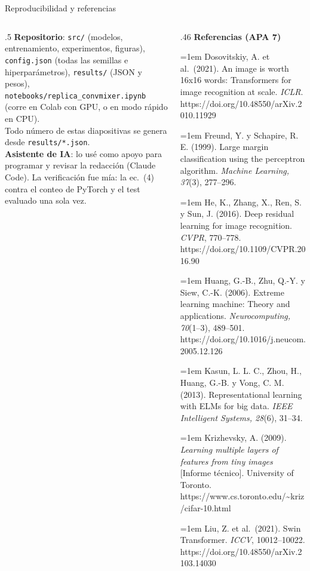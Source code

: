 \documentclass[aspectratio=169,xcolor=table]{beamer}
\begin{document}
\begin{frame}{Reproducibilidad y referencias}
  \begin{columns}[T]
    \begin{column}{.5\textwidth}\footnotesize
      \textbf{Repositorio}: \texttt{src/} (modelos, entrenamiento, experimentos, figuras), \texttt{config.json}
      (todas las semillas e hiperparámetros), \texttt{results/} (JSON y pesos),
      \texttt{notebooks/replica\_convmixer.ipynb} (corre en Colab con GPU, o en modo rápido en CPU).\\[4pt]
      Todo número de estas diapositivas se genera desde \texttt{results/*.json}.\\[4pt]
      \textbf{Asistente de IA}: lo usé como apoyo para programar y revisar la redacción (Claude Code). La
      verificación fue mía: la ec.~(4) contra el conteo de PyTorch y el test evaluado una sola vez.
    \end{column}
    \begin{column}{.46\textwidth}\fontsize{5}{6}\selectfont
      \textbf{Referencias (APA 7)}\par\vspace{2pt}
      \hangindent=1em Dosovitskiy, A. et al.\ (2021). An image is worth 16x16 words: Transformers for image recognition at scale. \emph{ICLR}. https://doi.org/10.48550/arXiv.2010.11929\par
      \hangindent=1em Freund, Y. y Schapire, R. E. (1999). Large margin classification using the perceptron algorithm. \emph{Machine Learning, 37}(3), 277--296.\par
      \hangindent=1em He, K., Zhang, X., Ren, S. y Sun, J. (2016). Deep residual learning for image recognition. \emph{CVPR}, 770--778. https://doi.org/10.1109/CVPR.2016.90\par
      \hangindent=1em Huang, G.-B., Zhu, Q.-Y. y Siew, C.-K. (2006). Extreme learning machine: Theory and applications. \emph{Neurocomputing, 70}(1--3), 489--501. https://doi.org/10.1016/j.neucom.2005.12.126\par
      \hangindent=1em Kasun, L. L. C., Zhou, H., Huang, G.-B. y Vong, C. M. (2013). Representational learning with ELMs for big data. \emph{IEEE Intelligent Systems, 28}(6), 31--34.\par
      \hangindent=1em Krizhevsky, A. (2009). \emph{Learning multiple layers of features from tiny images} [Informe técnico]. University of Toronto. https://www.cs.toronto.edu/\textasciitilde kriz/cifar-10.html\par
      \hangindent=1em Liu, Z. et al.\ (2021). Swin Transformer. \emph{ICCV}, 10012--10022. https://doi.org/10.48550/arXiv.2103.14030\par

\end{column}
\end{columns}
\end{frame}
\end{document}
